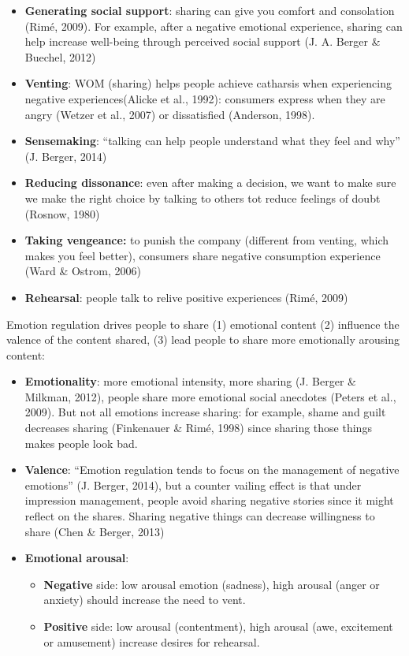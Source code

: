 \documentclass[
]{book}
\providecommand{\tightlist}{%
  \setlength{\itemsep}{0pt}\setlength{\parskip}{0pt}}
\begin{document}
\begin{itemize}
\tightlist
\item
  \textbf{Generating social support}: sharing can give you comfort and consolation (Rimé, 2009). For example, after a negative emotional experience, sharing can help increase well-being through perceived social support (J. A. Berger \& Buechel, 2012)
\item
  \textbf{Venting}: WOM (sharing) helps people achieve catharsis when experiencing negative experiences(Alicke et al., 1992): consumers express when they are angry (Wetzer et al., 2007) or dissatisfied (Anderson, 1998).
\item
  \textbf{Sensemaking}: ``talking can help people understand what they feel and why'' (J. Berger, 2014)
\item
  \textbf{Reducing dissonance}: even after making a decision, we want to make sure we make the right choice by talking to others tot reduce feelings of doubt (Rosnow, 1980)
\item
  \textbf{Taking vengeance:} to punish the company (different from venting, which makes you feel better), consumers share negative consumption experience (Ward \& Ostrom, 2006)
\item
  \textbf{Rehearsal}: people talk to relive positive experiences (Rimé, 2009)
\end{itemize}

Emotion regulation drives people to share (1) emotional content (2) influence the valence of the content shared, (3) lead people to share more emotionally arousing content:

\begin{itemize}
\item
  \textbf{Emotionality}: more emotional intensity, more sharing (J. Berger \& Milkman, 2012), people share more emotional social anecdotes (Peters et al., 2009). But not all emotions increase sharing: for example, shame and guilt decreases sharing (Finkenauer \& Rimé, 1998) since sharing those things makes people look bad.
\item
  \textbf{Valence}: ``Emotion regulation tends to focus on the management of negative emotions'' (J. Berger, 2014), but a counter vailing effect is that under impression management, people avoid sharing negative stories since it might reflect on the shares. Sharing negative things can decrease willingness to share (Chen \& Berger, 2013)
\item
  \textbf{Emotional arousal}:

  \begin{itemize}
  \tightlist
  \item
    \textbf{Negative} side: low arousal emotion (sadness), high arousal (anger or anxiety) should increase the need to vent.
  \item
    \textbf{Positive} side: low arousal (contentment), high arousal (awe, excitement or amusement) increase desires for rehearsal.
  \end{itemize}
\end{itemize}
\end{document}
